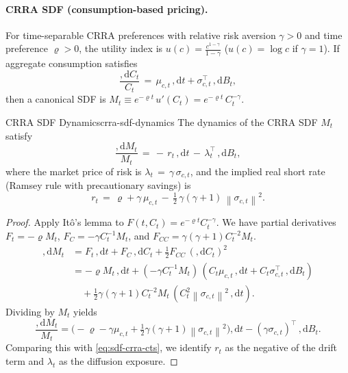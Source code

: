 \documentclass[11pt,letterpaper,oneside]{article}
\numberwithin{equation}{section}
\newcommand{\1}{\mathbf{1}}
\newcommand{\diff}{,\mathrm{d}}
\newcommand{\norm}[1]{\left\lVert #1\right\rVert}
\begin{document}
\paragraph{CRRA SDF (consumption-based pricing).}\label{sec:crra}
For time-separable CRRA preferences with relative risk aversion $\gamma>0$ and time preference $\varrho>0$, the utility index is $u(c)=\tfrac{c^{1-\gamma}}{1-\gamma}$ ($u(c)=\log c$ if $\gamma=1$). If aggregate consumption satisfies
\[
\frac{\diff C_t}{C_t} \,=\, \mu_{c,t}\,\diff t + \sigma_{c,t}^{\top}\,\diff B_t,
\]
then a canonical SDF is $M_t \equiv e^{-\varrho t}\,u'(C_t)= e^{-\varrho t}\,C_t^{-\gamma}$.

\begin{proposition}{CRRA SDF Dynamics}{crra-sdf-dynamics}
The dynamics of the CRRA SDF $M_t$ satisfy
\begin{equation}\label{eq:sdf-crra-cts}
\frac{\diff M_t}{M_t} \,=\, -\,r_t\,\diff t \, -\, \lambda_t^{\top}\,\diff B_t,
\end{equation}
where the market price of risk is $\lambda_t \,=\, \gamma\,\sigma_{c,t}$, and the implied real short rate (Ramsey rule with precautionary savings) is
\begin{equation}\label{eq:rfr-crra}
r_t \,=\, \varrho + \gamma\,\mu_{c,t} \, - \, \tfrac12\,\gamma(\gamma+1)\,\norm{\sigma_{c,t}}^2.
\end{equation}
\end{proposition}
\begin{proof}
Apply It\^o's lemma to $F(t, C_t) = e^{-\varrho t} C_t^{-\gamma}$. We have partial derivatives $F_t = -\varrho M_t$, $F_C = -\gamma C_t^{-1} M_t$, and $F_{CC} = \gamma(\gamma+1) C_t^{-2} M_t$.
\begin{align*}
\diff M_t &= F_t\,\diff t + F_C\,\diff C_t + \tfrac12 F_{CC}\,(\diff C_t)^2 \\
&= -\varrho M_t\,\diff t + (-\gamma C_t^{-1} M_t)\,(C_t \mu_{c,t}\,\diff t + C_t \sigma_{c,t}^\top\,\diff B_t) \\
&\quad + \tfrac12 \gamma(\gamma+1) C_t^{-2} M_t\,(C_t^2 \norm{\sigma_{c,t}}^2\,\diff t).
\end{align*}
Dividing by $M_t$ yields
\[
\frac{\diff M_t}{M_t} = \Big(-\varrho - \gamma\mu_{c,t} + \tfrac12\gamma(\gamma+1)\norm{\sigma_{c,t}}^2\Big)\diff t - (\gamma\sigma_{c,t})^\top\,\diff B_t.
\]
Comparing this with \eqref{eq:sdf-crra-cts}, we identify $r_t$ as the negative of the drift term and $\lambda_t$ as the diffusion exposure.
\end{proof}
\end{document}
